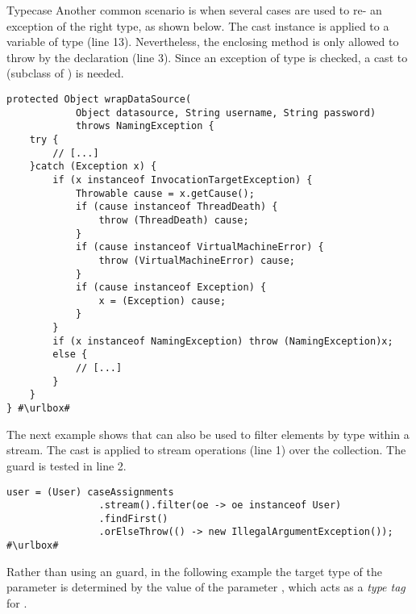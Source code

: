 \begin{pattern}{Typecase}
Another common scenario is when several cases are used to re-
an exception of the right type, as shown below.
The cast instance is applied to a variable of type 
(line 13).
Nevertheless, the enclosing method is only allowed to throw  by the  declaration (line 3).
Since an exception of type  is checked,
a cast to  (subclass of ) is needed.

\def\urlvar{http://bit.ly/codefollower_Tomcat_Research_2SGDUG5}
\begin{verbatim}
protected Object wrapDataSource(
			Object datasource, String username, String password)
			throws NamingException {
	try {
		// [...]
	}catch (Exception x) {
		if (x instanceof InvocationTargetException) {
			Throwable cause = x.getCause();
			if (cause instanceof ThreadDeath) {
				throw (ThreadDeath) cause;
			}
			if (cause instanceof VirtualMachineError) {
				throw (VirtualMachineError) cause;
			}
			if (cause instanceof Exception) {
				x = (Exception) cause;
			}
		}
		if (x instanceof NamingException) throw (NamingException)x;
		else {
			// [...]
		}
	}
} #\urlbox#
\end{verbatim}

The next example shows that \thisp{} can also be used to filter elements by type within a stream.
The cast is applied to stream operations (line 1) over the  collection.
The  guard is tested in line 2.

\def\urlvar{http://bit.ly/kiegroup_jbpm_2ENCL8a}
\begin{verbatim}
user = (User) caseAssignments
                .stream().filter(oe -> oe instanceof User)
                .findFirst()
                .orElseThrow(() -> new IllegalArgumentException());
#\urlbox#
\end{verbatim}

Rather than using an  guard, in the following example
the target type of the parameter  is determined by the value
of the parameter ,
which acts as a \emph{type tag} for .


\end{pattern}
